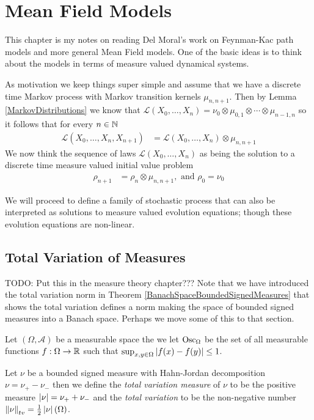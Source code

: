\chapter{Mean Field Models}

This chapter is my notes on reading Del Moral's work on Feynman-Kac path models and more general Mean Field models.  One of the basic ideas is to think about the models in terms of measure valued dynamical systems.  

As motivation we keep things super simple and assume that we have a discrete time Markov process with Markov transition kernels $\mu_{n, n+1}$.  Then by Lemma \ref{MarkovDistributions} we know
that $\mathcal{L}(X_0, \dotsc, X_n) = \nu_0 \otimes \mu_{0,1} \otimes \dotsb \otimes \mu_{n-1, n}$ so it follows that for every $n \in \mathbb{N}$
\begin{align*}
\mathcal{L}(X_0, \dotsc, X_n, X_{n+1}) &= \mathcal{L}(X_0, \dotsc, X_n) \otimes \mu_{n, n+1}
\end{align*}
We now think the sequence of laws $\mathcal{L}(X_0, \dotsc, X_n)$ as being the solution to a discrete time measure valued initial value problem 
\begin{align*}
\rho_{n+1} &= \rho_n \otimes \mu_{n,n+1}, \text{ and $\rho_0=\nu_0$}
\end{align*}

We will proceed to define a family of stochastic process that can also be interpreted as solutions to measure valued evolution equations; though these evolution equations are non-linear.

\section{Total Variation of Measures}

TODO: Put this in the measure theory chapter???  Note that we have introduced the total variation norm in Theorem \ref{BanachSpaceBoundedSignedMeasures}  that shows the total variation defines a norm making the space of bounded signed measures into a Banach space.  Perhaps we move some of this to that section.

\begin{defn}Let $(\Omega, \mathcal{A})$ be a measurable space the we let $\operatorname*{Osc}_{\Omega}$ be the set of all measurable functions $f : \Omega \to \mathbb{R}$ such that $\sup_{x,  y  \in \Omega} \left \vert f(x) - f(y) \right \vert \leq 1$.
\end{defn}


\begin{defn}Let $\nu$ be a bounded signed measure with Hahn-Jordan decomposition $\nu = \nu_+ - \nu_-$ then we define the \emph{total variation measure} of $\nu$ to be the positive measure $\left \vert \nu \right \vert = \nu_+ + \nu_-$ and the \emph{total variation} to be the non-negative number $\left \lVert  \nu \right \rVert_{tv} = \frac{1}{2}\left \vert \nu \right \vert(\Omega)$.
\end{defn}

